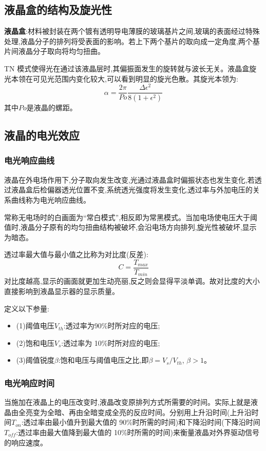 \documentclass[12pt, a4paper]{article}
\begin{document}
\subsection{液晶盒的结构及旋光性}
\textbf{液晶盒}:材料被封装在两个镀有透明导电薄膜的玻璃基片之间,玻璃的表面经过特殊处理,液晶分子的排列将受表面的影响。若上下两个基片的取向成一定角度,两个基片间液晶分子取向将均匀扭曲。

TN 模式使得光在通过该液晶层时,其偏振面发生的旋转就与波长无关。液晶盒旋光本领在可见光范围内变化较大,可以看到明显的旋光色散。其旋光本领为:
\begin{equation}
    \alpha = \frac{2\pi}{Po} \frac{\Delta \epsilon^2}{8(1+\epsilon^2)}
\end{equation}
其中$Po$是液晶的螺距。

\subsection{液晶的电光效应}

\subsubsection{电光响应曲线}
液晶在外电场作用下,分子取向发生改变,光通过液晶盒时偏振状态也发生变化,若透过液晶盒后检偏器透光位置不变,系统透光强度将发生变化,透过率与外加电压的关系曲线称为电光响应曲线。

常称无电场时的白画面为“常白模式”,相反即为常黑模式。当加电场使电压大于阈值时,液晶分子原有的均匀扭曲结构被破坏,会沿电场方向排列,旋光性被破坏,显示为暗态。

透过率最大值与最小值之比称为对比度(反差):
\begin{equation}
    C = \frac{T_{max}}{T_{min}}
\end{equation}
对比度越高,显示的画面就更加生动亮丽,反之则会显得平淡单调。故对比度的大小直接影响到液晶显示器的显示质量。

定义以下参量:
\begin{itemize}
    \item (1)阈值电压$V_{th}$:透过率为90\%时所对应的电压;
    \item (2)饱和电压$V_s$:透过率为 10\%时所对应的电压;
    \item (3)阈值锐度$\beta$:饱和电压与阈值电压之比,即$\beta = V_s / V_{th}$, $\beta>1$。
\end{itemize}
\subsubsection{电光响应时间}
当施加在液晶上的电压改变时,液晶改变原排列方式所需要的时间。实际上就是液晶由全亮变为全暗、再由全暗变成全亮的反应时间。分别用上升沿时间(上升沿时间$T_{on}$:透过率由最小值升到最大值的 90\%时所需的时间)和下降沿时间(下降沿时间$T_{off}$:透过率由最大值降到最大值的 10\%时所需的时间)来衡量液晶对外界驱动信号的响应速度。
\end{document}
